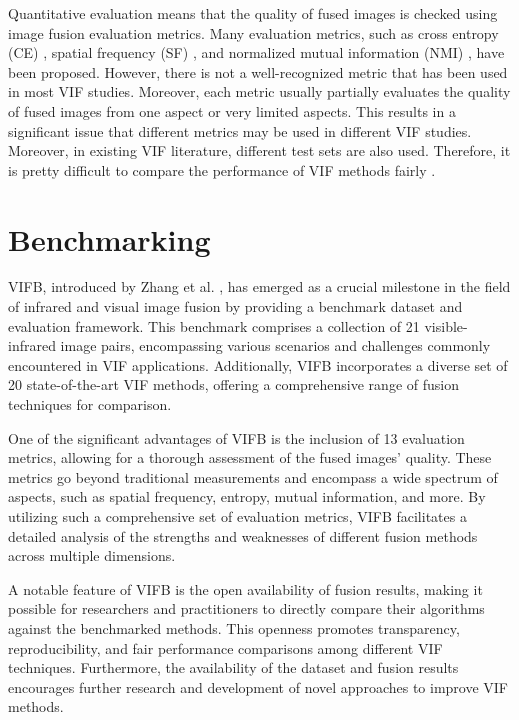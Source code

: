 Quantitative evaluation means that the quality of fused images is checked using image fusion evaluation metrics. Many evaluation metrics, such as cross entropy (CE) \cite{bulanon2009image}, spatial frequency (SF) \cite{eskicioglu1995image}, and normalized mutual information (NMI) \cite{hossny2008comments}, have been proposed. However, there is not a well-recognized metric that has been used in most VIF studies. Moreover, each metric usually partially evaluates the quality of fused images from one aspect or very limited aspects. This results in a significant issue that different metrics may be used in different VIF studies. Moreover, in existing VIF literature, different test sets are also used. Therefore, it is pretty difficult to compare the performance of VIF methods fairly \cite{bulanon2009image, eskicioglu1995image, hossny2008comments}.

\section{Benchmarking}

VIFB, introduced by Zhang et al. \cite{zhang2020vifb}, has emerged as a crucial milestone in the field of infrared and visual image fusion by providing a benchmark dataset and evaluation framework. This benchmark comprises a collection of 21 visible-infrared image pairs, encompassing various scenarios and challenges commonly encountered in VIF applications. Additionally, VIFB incorporates a diverse set of 20 state-of-the-art VIF methods, offering a comprehensive range of fusion techniques for comparison.

One of the significant advantages of VIFB is the inclusion of 13 evaluation metrics, allowing for a thorough assessment of the fused images' quality. These metrics go beyond traditional measurements and encompass a wide spectrum of aspects, such as spatial frequency, entropy, mutual information, and more. By utilizing such a comprehensive set of evaluation metrics, VIFB facilitates a detailed analysis of the strengths and weaknesses of different fusion methods across multiple dimensions.

A notable feature of VIFB is the open availability of fusion results, making it possible for researchers and practitioners to directly compare their algorithms against the benchmarked methods. This openness promotes transparency, reproducibility, and fair performance comparisons among different VIF techniques. Furthermore, the availability of the dataset and fusion results encourages further research and development of novel approaches to improve VIF methods.

